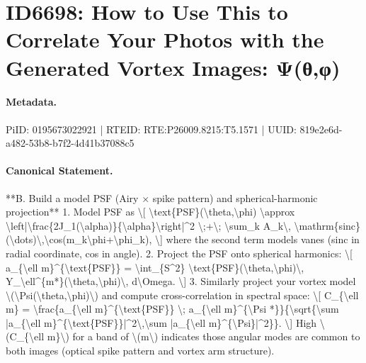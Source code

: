 \section*{ID6698: How to Use This to Correlate Your Photos with the Generated Vortex Images: Ψ(θ,φ)}
\paragraph{Metadata.}
PiID: 0195673022921 | RTEID: RTE:P26009.8215:T5.1571 | UUID: 819e2e6d-a482-53b8-b7f2-4d41b37088c5

\paragraph{Canonical Statement.}
**B. Build a model PSF (Airy × spike pattern) and spherical-harmonic projection** 1. Model PSF as \textbackslash{}[ \textbackslash{}text\{PSF\}(\textbackslash{}theta,\textbackslash{}phi) \textbackslash{}approx \textbackslash{}left|\textbackslash{}frac\{2J\_1(\textbackslash{}alpha)\}\{\textbackslash{}alpha\}\textbackslash{}right|\textasciicircum{}2 \textbackslash{};+\textbackslash{}; \textbackslash{}sum\_k A\_k\textbackslash{}, \textbackslash{}mathrm\{sinc\}(\textbackslash{}dots)\textbackslash{},\textbackslash{}cos(m\_k\textbackslash{}phi+\textbackslash{}phi\_k), \textbackslash{}] where the second term models vanes (sinc in radial coordinate, cos in angle). 2. Project the PSF onto spherical harmonics: \textbackslash{}[ a\_\{\textbackslash{}ell m\}\textasciicircum{}\{\textbackslash{}text\{PSF\}\} = \textbackslash{}int\_\{S\textasciicircum{}2\} \textbackslash{}text\{PSF\}(\textbackslash{}theta,\textbackslash{}phi)\textbackslash{}, Y\_\textbackslash{}ell\textasciicircum{}\{m*\}(\textbackslash{}theta,\textbackslash{}phi)\textbackslash{}, d\textbackslash{}Omega. \textbackslash{}] 3. Similarly project your vortex model \textbackslash{}(\textbackslash{}Psi(\textbackslash{}theta,\textbackslash{}phi)\textbackslash{}) and compute cross-correlation in spectral space: \textbackslash{}[ C\_\{\textbackslash{}ell m\} = \textbackslash{}frac\{a\_\{\textbackslash{}ell m\}\textasciicircum{}\{\textbackslash{}text\{PSF\}\} \textbackslash{}; a\_\{\textbackslash{}ell m\}\textasciicircum{}\{\textbackslash{}Psi *\}\}\{\textbackslash{}sqrt\{\textbackslash{}sum |a\_\{\textbackslash{}ell m\}\textasciicircum{}\{\textbackslash{}text\{PSF\}\}|\textasciicircum{}2\textbackslash{},\textbackslash{}sum |a\_\{\textbackslash{}ell m\}\textasciicircum{}\{\textbackslash{}Psi\}|\textasciicircum{}2\}\}. \textbackslash{}] High \textbackslash{}(C\_\{\textbackslash{}ell m\}\textbackslash{}) for a band of \textbackslash{}(m\textbackslash{}) indicates those angular modes are common to both images (optical spike pattern and vortex arm structure).

